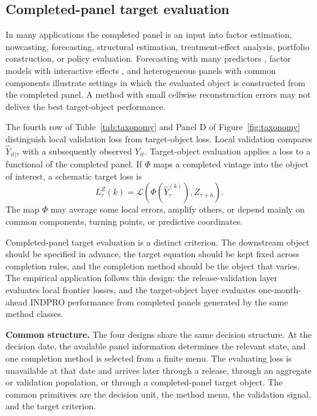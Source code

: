\documentclass[a4paper, 12pt]{article}
\theoremstyle{plain}
\theoremstyle{remark}
\newcommand{\1}{\mathbf{1}}
\begin{document}
\subsection{Completed-panel target evaluation}

In many applications the completed panel is an input into factor estimation, nowcasting, forecasting, structural estimation, treatment-effect analysis, portfolio construction, or policy evaluation. Forecasting with many predictors \citep{StockWatson2002}, factor models with interactive effects \citep{Bai2009}, and heterogeneous panels with common components \citep{Pesaran2006,PesaranPickTimmermann2024} illustrate settings in which the evaluated object is constructed from the completed panel. A method with small cellwise reconstruction errors may not deliver the best target-object performance.

The fourth row of Table~\ref{tab:taxonomy} and Panel D of Figure~\ref{fig:taxonomy} distinguish local validation loss from target-object loss. Local validation compares \(\widehat Y_{it|\tau}\) with a subsequently observed \(Y_{it}\). Target-object evaluation applies a loss to a functional of the completed panel. If \(\Phi\) maps a completed vintage into the object of interest, a schematic target loss is
\begin{equation*}
  L^Z_\tau(k)=\mathcal L\left(\Phi\left(\widehat Y^{(k)}_\tau\right), Z_{\tau+h}\right).
\end{equation*}
The map \(\Phi\) may average some local errors, amplify others, or depend mainly on common components, turning points, or predictive coordinates.

Completed-panel target evaluation is a distinct criterion. The downstream object should be specified in advance, the target equation should be kept fixed across completion rules, and the completion method should be the object that varies. The empirical application follows this design: the release-validation layer evaluates local frontier losses, and the target-object layer evaluates one-month-ahead INDPRO performance from completed panels generated by the same method classes.

\vspace{0.7em}
\noindent\textbf{Common structure.}
The four designs share the same decision structure. At the decision date, the available panel information determines the relevant state, and one completion method is selected from a finite menu. The evaluating loss is unavailable at that date and arrives later through a release, through an aggregate or validation population, or through a completed-panel target object. The common primitives are the decision unit, the method menu, the validation signal, and the target criterion.
\end{document}
